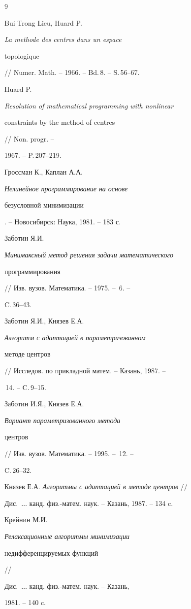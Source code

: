 \begin{thebibliography}{9} 


 




Bui Trong Lieu, Huard P. {\em La methode des centres dans un espace 


topologique} // Numer. Math. -- 1966. -- Bd.\,8. -- S.\,56--67. 




Huard P. {\em Resolution of mathematical programming with nonlinear 


constraints by the method of centres} // Non. progr. -- 


1967. -- P.\,207--219. 




Гроссман К., Каплан А.А. {\em Нелинейное программирование на основе 


безусловной минимизации}. -- Новосибирск: Наука, 1981. -- 183 с. 




Заботин Я.И. {\em Минимаксный метод решения задачи математического 


программирования} //  Изв. вузов. Математика. -- 1975. -- \No\,6. -- 


C.\,36--43. 




Заботин Я.И., Князев Е.А. {\em Алгоритм с адаптацией в параметризованном 


методе центров} // Исследов. по прикладной матем. -- Казань, 1987. --


\No\,14. -- C.\,9--15. 




Заботин И.Я., Князев Е.А. {\em Вариант параметризованного метода 


центров} // Изв. вузов. Математика. -- 1995. -- \No\,12. -- 


C.\,26--32. 




Князев Е.А. {\em Алгоритмы с адаптацией в методе центров} //


Дис.~$\dotsc$ канд. физ.-матем. наук. -- Казань, 1987. -- 134 c. 




Крейнин М.И. {\em Релаксационные алгоритмы минимизации 


недифференцируемых функций} //  


Дис.~$\dotsc$ канд. физ.-матем. наук. -- Казань,  


1981. -- 140 c. 


 


\end{thebibliography} 


 


\vskip 2cm 


 






 


\label{end} 


 


